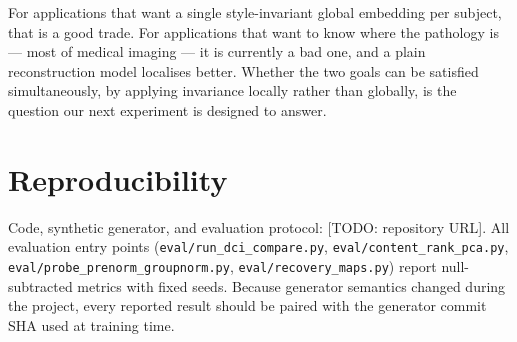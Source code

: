 \documentclass[11pt]{article}
\newcommand{\todo}[1]{{\color{blue}\small[TODO: #1]}}
\begin{document}
For applications that want a single style-invariant global embedding per
subject, that is a good trade. For applications that want to know where the
pathology is --- most of medical imaging --- it is currently a bad one, and a
plain reconstruction model localises better. Whether the two goals can be
satisfied simultaneously, by applying invariance locally rather than globally,
is the question our next experiment is designed to answer.

\section*{Reproducibility}
Code, synthetic generator, and evaluation protocol:
\todo{repository URL}. All evaluation entry points
(\texttt{eval/run\_dci\_compare.py}, \texttt{eval/content\_rank\_pca.py},
\texttt{eval/probe\_prenorm\_groupnorm.py}, \texttt{eval/recovery\_maps.py})
report null-subtracted metrics with fixed seeds. Because generator semantics
changed during the project, every reported result should be paired with the
generator commit SHA used at training time.
\end{document}

